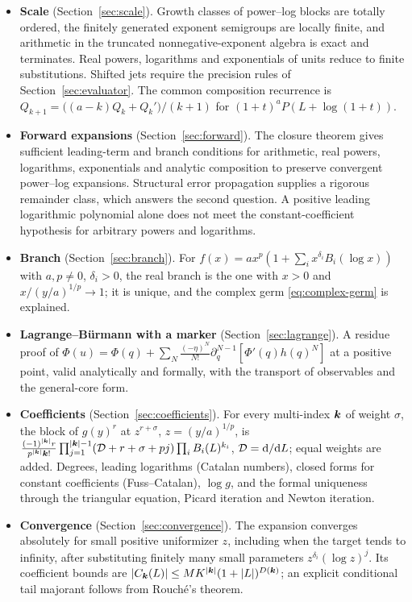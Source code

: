 \begin{itemize}[leftmargin=1.6em]
\item \textbf{Scale} (Section~\ref{sec:scale}). Growth classes of power--log blocks are totally ordered, the finitely generated exponent semigroups are locally finite, and arithmetic in the truncated nonnegative-exponent algebra is exact and terminates. Real powers, logarithms and exponentials of units reduce to finite substitutions. Shifted jets require the precision rules of Section~\ref{sec:evaluator}. The common composition recurrence is $Q_{k+1}=\bigl((a-k)Q_k+Q_k'\bigr)/(k+1)$ for $(1+t)^aP(L+\log(1+t))$.
\item \textbf{Forward expansions} (Section~\ref{sec:forward}). The closure theorem gives sufficient leading-term and branch conditions for arithmetic, real powers, logarithms, exponentials and analytic composition to preserve convergent power--log expansions. Structural error propagation supplies a rigorous remainder class, which answers the second question. A positive leading logarithmic polynomial alone does not meet the constant-coefficient hypothesis for arbitrary powers and logarithms.
\item \textbf{Branch} (Section~\ref{sec:branch}). For $f(x)=ax^p(1+\sum_ix^{\delta_i}B_i(\log x))$ with $a,p\ne0$, $\delta_i>0$, the real branch is the one with $x>0$ and $x/(y/a)^{1/p}\to1$; it is unique, and the complex germ \eqref{eq:complex-germ} is explained.
\item \textbf{Lagrange--B\"urmann with a marker} (Section~\ref{sec:lagrange}). A residue proof of $\Phi(u)=\Phi(q)+\sum_N\frac{(-\eta)^N}{N!}\partial_q^{N-1}[\Phi'(q)h(q)^N]$ at a positive point, valid analytically and formally, with the transport of observables and the general-core form.
\item \textbf{Coefficients} (Section~\ref{sec:coefficients}). For every multi-index $\boldsymbol k$ of weight $\sigma$, the block of $g(y)^r$ at $z^{r+\sigma}$, $z=(y/a)^{1/p}$, is
 $\frac{(-1)^{|\boldsymbol k|}r}{p^{|\boldsymbol k|}\boldsymbol k!}\prod_{j=1}^{|\boldsymbol k|-1}(\mathcal D+r+\sigma+pj)\prod_iB_i(L)^{k_i}$, $\mathcal D=\mathrm d/\mathrm d L$; equal weights are added. Degrees, leading logarithms (Catalan numbers), closed forms for constant coefficients (Fuss--Catalan), $\log g$, and the formal uniqueness through the triangular equation, Picard iteration and Newton iteration.
\item \textbf{Convergence} (Section~\ref{sec:convergence}). The expansion converges absolutely for small positive uniformizer $z$, including when the target tends to infinity, after substituting finitely many small parameters $z^{\delta_i}(\log z)^j$. Its coefficient bounds are $|C_{\boldsymbol k}(L)|\le MK^{|\boldsymbol k|}(1+|L|)^{D(\boldsymbol k)}$; an explicit conditional tail majorant follows from Rouch\'e's theorem.

\end{itemize}
